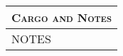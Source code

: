 \documentclass[10pt,letterpaper,twocolumn]{article}
\begin{document}
\begin{table}[t]
    \begin{tabularx}{\linewidth}{| X |}
        \multicolumn{1}{l}{\textsc{Cargo and Notes}} \\
        \hline
        NOTES \ \newline \newline \newline \newline \newline \newline \newline \newline \newline  \newline \newline \newline \newline \\
        \hline
    \end{tabularx}
\end{table}
\end{document}
